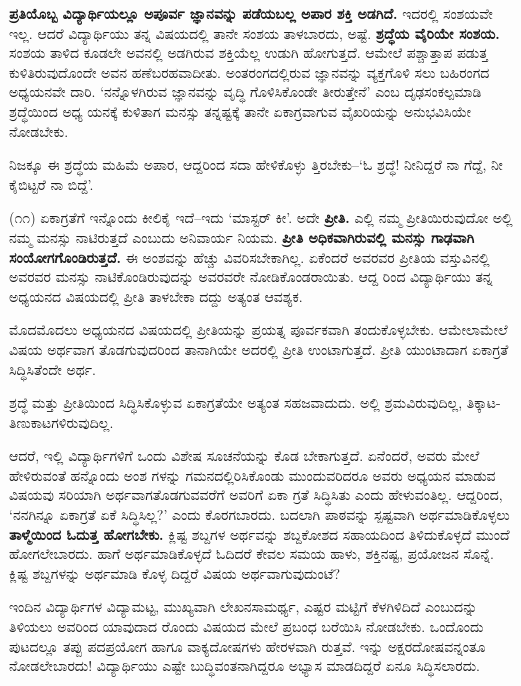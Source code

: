 \textbf{ಪ್ರತಿಯೊಬ್ಬ ವಿದ್ಯಾರ್ಥಿಯಲ್ಲೂ ಅಪೂರ್ವ ಜ್ಞಾನವನ್ನು ಪಡೆಯಬಲ್ಲ ಅಪಾರ ಶಕ್ತಿ ಅಡಗಿದೆ.} ಇದರಲ್ಲಿ ಸಂಶಯವೇ ಇಲ್ಲ. ಆದರೆ ವಿದ್ಯಾರ್ಥಿಯು ತನ್ನ ವಿಷಯದಲ್ಲಿ ತಾನೇ ಸಂಶಯ ತಾಳಬಾರದು, ಅಷ್ಟೆ. \textbf{ಶ್ರದ್ಧೆಯ ವೈರಿಯೇ ಸಂಶಯ.} ಸಂಶಯ ತಾಳಿದ ಕೂಡಲೇ ಅವನಲ್ಲಿ ಅಡಗಿರುವ ಶಕ್ತಿಯೆಲ್ಲ ಉಡುಗಿ ಹೋಗುತ್ತದೆ. ಆಮೇಲೆ ಪಶ್ಚಾತ್ತಾಪ ಪಡುತ್ತ ಕುಳಿತಿರುವುದೊಂದೇ ಅವನ ಹಣೆಬರಹವಾದೀತು. ಅಂತರಂಗದಲ್ಲಿರುವ ಜ್ಞಾನವನ್ನು ವ್ಯಕ್ತಗೊಳಿ ಸಲು ಬಹಿರಂಗದ ಅಧ್ಯಯನವೇ ದಾರಿ. ‘ನನ್ನೊಳಗಿರುವ ಜ್ಞಾನವನ್ನು ವೃದ್ಧಿ ಗೊಳಿಸಿಕೊಂಡೇ ತೀರುತ್ತೇನೆ’ ಎಂಬ ದೃಢಸಂಕಲ್ಪಮಾಡಿ ಶ್ರದ್ಧೆಯಿಂದ ಅಧ್ಯ ಯನಕ್ಕೆ ಕುಳಿತಾಗ ಮನಸ್ಸು ತನ್ನಷ್ಟಕ್ಕೆ ತಾನೇ ಏಕಾಗ್ರವಾಗುವ ವೈಖರಿಯನ್ನು ಅನುಭವಿಸಿಯೇ ನೋಡಬೇಕು.

ನಿಜಕ್ಕೂ ಈ ಶ್ರದ್ಧೆಯ ಮಹಿಮೆ ಅಪಾರ, ಆದ್ದರಿಂದ ಸದಾ ಹೇಳಿಕೊಳ್ಳು ತ್ತಿರಬೇಕು–‘ಓ ಶ್ರದ್ಧೆ! ನೀನಿದ್ದರೆ ನಾ ಗೆದ್ದೆ, ನೀ ಕೈಬಿಟ್ಟರೆ ನಾ ಬಿದ್ದೆ’.

(೧೧) ಏಕಾಗ್ರತೆಗೆ ಇನ್ನೊಂದು ಕೀಲಿಕೈ ಇದೆ–ಇದು ‘ಮಾಸ್ಟರ್ ಕೀ’. ಅದೇ \textbf{ಪ್ರೀತಿ.} ಎಲ್ಲಿ ನಮ್ಮ ಪ್ರೀತಿಯಿರುವುದೋ ಅಲ್ಲಿ ನಮ್ಮ ಮನಸ್ಸು ನಾಟಿರುತ್ತದೆ ಎಂಬುದು ಅನಿವಾರ್ಯ ನಿಯಮ. \textbf{ಪ್ರೀತಿ ಅಧಿಕವಾಗಿರುವಲ್ಲಿ ಮನಸ್ಸು ಗಾಢವಾಗಿ ಸಂಯೋಗಗೊಂಡಿರುತ್ತದೆ.} ಈ ಅಂಶವನ್ನು ಹೆಚ್ಚು ವಿವರಿಸಬೇಕಾಗಿಲ್ಲ. ಏಕೆಂದರೆ ಅವರವರ ಪ್ರೀತಿಯ ವಸ್ತುವಿನಲ್ಲಿ ಅವರವರ ಮನಸ್ಸು ನಾಟಿಕೊಂಡಿರುವುದನ್ನು ಅವರವರೇ ನೋಡಿಕೊಂಡರಾಯಿತು. ಆದ್ದ ರಿಂದ ವಿದ್ಯಾರ್ಥಿಯು ತನ್ನ ಅಧ್ಯಯನದ ವಿಷಯದಲ್ಲಿ ಪ್ರೀತಿ ತಾಳಬೇಕಾ ದದ್ದು ಅತ್ಯಂತ ಆವಶ್ಯಕ.

ಮೊದಮೊದಲು ಅಧ್ಯಯನದ ವಿಷಯದಲ್ಲಿ ಪ್ರೀತಿಯನ್ನು ಪ್ರಯತ್ನ ಪೂರ್ವಕವಾಗಿ ತಂದುಕೊಳ್ಳಬೇಕು. ಆಮೇಲಾಮೇಲೆ ವಿಷಯ ಅರ್ಥವಾಗ ತೊಡಗುವುದರಿಂದ ತಾನಾಗಿಯೇ ಅದರಲ್ಲಿ ಪ್ರೀತಿ ಉಂಟಾಗುತ್ತದೆ. ಪ್ರೀತಿ ಯುಂಟಾದಾಗ ಏಕಾಗ್ರತೆ ಸಿದ್ಧಿಸಿತೆಂದೇ ಅರ್ಥ.

ಶ್ರದ್ಧೆ ಮತ್ತು ಪ್ರೀತಿಯಿಂದ ಸಿದ್ಧಿಸಿಕೊಳ್ಳುವ ಏಕಾಗ್ರತೆಯೇ ಅತ್ಯಂತ ಸಹಜವಾದುದು. ಅಲ್ಲಿ ಶ್ರಮವಿರುವುದಿಲ್ಲ, ತಿಕ್ಕಾಟ-ತಿಣುಕಾಟಗಳಿರುವುದಿಲ್ಲ.

ಆದರೆ, ಇಲ್ಲಿ ವಿದ್ಯಾರ್ಥಿಗಳಿಗೆ ಒಂದು ವಿಶೇಷ ಸೂಚನೆಯನ್ನು ಕೊಡ ಬೇಕಾಗುತ್ತದೆ. ಏನೆಂದರೆ, ಅವರು ಮೇಲೆ ಹೇಳಿರುವಂತೆ ಹನ್ನೊಂದು ಅಂಶ ಗಳನ್ನು ಗಮನದಲ್ಲಿರಿಸಿಕೊಂಡು ಮುಂದುವರಿದರೂ ಅವರು ಅಧ್ಯಯನ ಮಾಡುವ ವಿಷಯವು ಸರಿಯಾಗಿ ಅರ್ಥವಾಗತೊಡಗುವವರೆಗೆ ಅವರಿಗೆ ಏಕಾ ಗ್ರತೆ ಸಿದ್ಧಿಸಿತು ಎಂದು ಹೇಳುವಂತಿಲ್ಲ. ಆದ್ದರಿಂದ, ‘ನನಗಿನ್ನೂ ಏಕಾಗ್ರತೆ ಏಕೆ ಸಿದ್ಧಿಸಿಲ್ಲ?’ ಎಂದು ಕೊರಗಬಾರದು. ಬದಲಾಗಿ ಪಾಠವನ್ನು ಸ್ಪಷ್ಟವಾಗಿ ಅರ್ಥಮಾಡಿಕೊಳ್ಳಲು \textbf{ತಾಳ್ಮೆಯಿಂದ ಓದುತ್ತ ಹೋಗಬೇಕು.} ಕ್ಲಿಷ್ಟ ಶಬ್ದಗಳ ಅರ್ಥವನ್ನು ಶಬ್ದಕೋಶದ ಸಹಾಯದಿಂದ ತಿಳಿದುಕೊಳ್ಳದೆ ಮುಂದೆ ಹೋಗಲೇಬಾರದು. ಹಾಗೆ ಅರ್ಥಮಾಡಿಕೊಳ್ಳದೆ ಓದಿದರೆ ಕೇವಲ ಸಮಯ ಹಾಳು, ಶಕ್ತಿನಷ್ಟ, ಪ್ರಯೋಜನ ಸೊನ್ನೆ. ಕ್ಲಿಷ್ಟ ಶಬ್ದಗಳನ್ನು ಅರ್ಥಮಾಡಿ ಕೊಳ್ಳ ದಿದ್ದರೆ ವಿಷಯ ಅರ್ಥವಾಗುವುದುಂಟೆ?

ಇಂದಿನ ವಿದ್ಯಾರ್ಥಿಗಳ ವಿದ್ಯಾಮಟ್ಟ, ಮುಖ್ಯವಾಗಿ ಲೇಖನಸಾಮರ್ಥ್ಯ, ಎಷ್ಟರ ಮಟ್ಟಿಗೆ ಕೆಳಗಿಳಿದಿದೆ ಎಂಬುದನ್ನು ತಿಳಿಯಲು ಅವರಿಂದ ಯಾವುದಾದ ರೊಂದು ವಿಷಯದ ಮೇಲೆ ಪ್ರಬಂಧ ಬರೆಯಿಸಿ ನೋಡಬೇಕು. ಒಂದೊಂದು ಪುಟದಲ್ಲೂ ತಪ್ಪು ಪದಪ್ರಯೋಗ ಹಾಗೂ ವಾಕ್ಯದೋಷಗಳು ಹೇರಳವಾಗಿ ರುತ್ತವೆ. ಇನ್ನು ಅಕ್ಷರದೋಷವನ್ನಂತೂ ನೋಡಲೇಬಾರದು! ವಿದ್ಯಾರ್ಥಿಯು ಎಷ್ಟೇ ಬುದ್ಧಿವಂತನಾಗಿದ್ದರೂ ಅಭ್ಯಾಸ ಮಾಡದಿದ್ದರೆ ಏನೂ ಸಿದ್ಧಿಸಲಾರದು.

